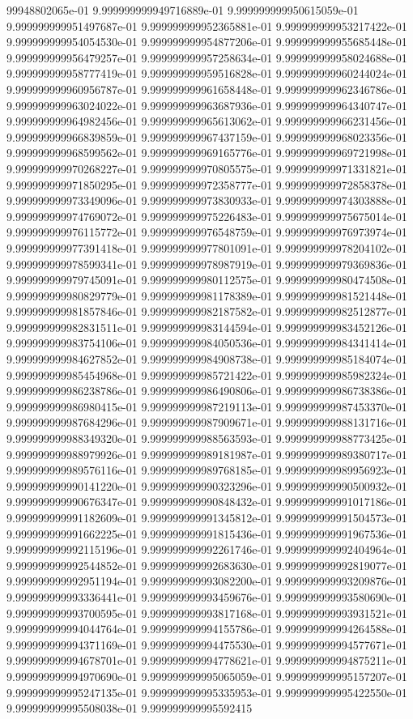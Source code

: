 99948802065e-01	9.999999999949716889e-01	9.999999999950615059e-01	9.999999999951497687e-01	9.999999999952365881e-01	9.999999999953217422e-01	9.999999999954054530e-01	9.999999999954877206e-01	9.999999999955685448e-01	9.999999999956479257e-01	9.999999999957258634e-01	9.999999999958024688e-01	9.999999999958777419e-01	9.999999999959516828e-01	9.999999999960244024e-01	9.999999999960956787e-01	9.999999999961658448e-01	9.999999999962346786e-01	9.999999999963024022e-01	9.999999999963687936e-01	9.999999999964340747e-01	9.999999999964982456e-01	9.999999999965613062e-01	9.999999999966231456e-01	9.999999999966839859e-01	9.999999999967437159e-01	9.999999999968023356e-01	9.999999999968599562e-01	9.999999999969165776e-01	9.999999999969721998e-01	9.999999999970268227e-01	9.999999999970805575e-01	9.999999999971331821e-01	9.999999999971850295e-01	9.999999999972358777e-01	9.999999999972858378e-01	9.999999999973349096e-01	9.999999999973830933e-01	9.999999999974303888e-01	9.999999999974769072e-01	9.999999999975226483e-01	9.999999999975675014e-01	9.999999999976115772e-01	9.999999999976548759e-01	9.999999999976973974e-01	9.999999999977391418e-01	9.999999999977801091e-01	9.999999999978204102e-01	9.999999999978599341e-01	9.999999999978987919e-01	9.999999999979369836e-01	9.999999999979745091e-01	9.999999999980112575e-01	9.999999999980474508e-01	9.999999999980829779e-01	9.999999999981178389e-01	9.999999999981521448e-01	9.999999999981857846e-01	9.999999999982187582e-01	9.999999999982512877e-01	9.999999999982831511e-01	9.999999999983144594e-01	9.999999999983452126e-01	9.999999999983754106e-01	9.999999999984050536e-01	9.999999999984341414e-01	9.999999999984627852e-01	9.999999999984908738e-01	9.999999999985184074e-01	9.999999999985454968e-01	9.999999999985721422e-01	9.999999999985982324e-01	9.999999999986238786e-01	9.999999999986490806e-01	9.999999999986738386e-01	9.999999999986980415e-01	9.999999999987219113e-01	9.999999999987453370e-01	9.999999999987684296e-01	9.999999999987909671e-01	9.999999999988131716e-01	9.999999999988349320e-01	9.999999999988563593e-01	9.999999999988773425e-01	9.999999999988979926e-01	9.999999999989181987e-01	9.999999999989380717e-01	9.999999999989576116e-01	9.999999999989768185e-01	9.999999999989956923e-01	9.999999999990141220e-01	9.999999999990323296e-01	9.999999999990500932e-01	9.999999999990676347e-01	9.999999999990848432e-01	9.999999999991017186e-01	9.999999999991182609e-01	9.999999999991345812e-01	9.999999999991504573e-01	9.999999999991662225e-01	9.999999999991815436e-01	9.999999999991967536e-01	9.999999999992115196e-01	9.999999999992261746e-01	9.999999999992404964e-01	9.999999999992544852e-01	9.999999999992683630e-01	9.999999999992819077e-01	9.999999999992951194e-01	9.999999999993082200e-01	9.999999999993209876e-01	9.999999999993336441e-01	9.999999999993459676e-01	9.999999999993580690e-01	9.999999999993700595e-01	9.999999999993817168e-01	9.999999999993931521e-01	9.999999999994044764e-01	9.999999999994155786e-01	9.999999999994264588e-01	9.999999999994371169e-01	9.999999999994475530e-01	9.999999999994577671e-01	9.999999999994678701e-01	9.999999999994778621e-01	9.999999999994875211e-01	9.999999999994970690e-01	9.999999999995065059e-01	9.999999999995157207e-01	9.999999999995247135e-01	9.999999999995335953e-01	9.999999999995422550e-01	9.999999999995508038e-01	9.999999999995592415